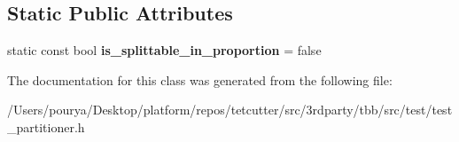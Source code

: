 \subsection*{Static Public Attributes}
\begin{DoxyCompactItemize}
\item 
\hypertarget{classtest__partitioner__utils_1_1interaction__with__range__and__partitioner_1_1Range2_a547a7114f6e0ac6b7bf1de1fa088623f}{}static const bool {\bfseries is\+\_\+splittable\+\_\+in\+\_\+proportion} = false\label{classtest__partitioner__utils_1_1interaction__with__range__and__partitioner_1_1Range2_a547a7114f6e0ac6b7bf1de1fa088623f}

\end{DoxyCompactItemize}


The documentation for this class was generated from the following file\+:\begin{DoxyCompactItemize}
\item 
/\+Users/pourya/\+Desktop/platform/repos/tetcutter/src/3rdparty/tbb/src/test/test\+\_\+partitioner.\+h\end{DoxyCompactItemize}
